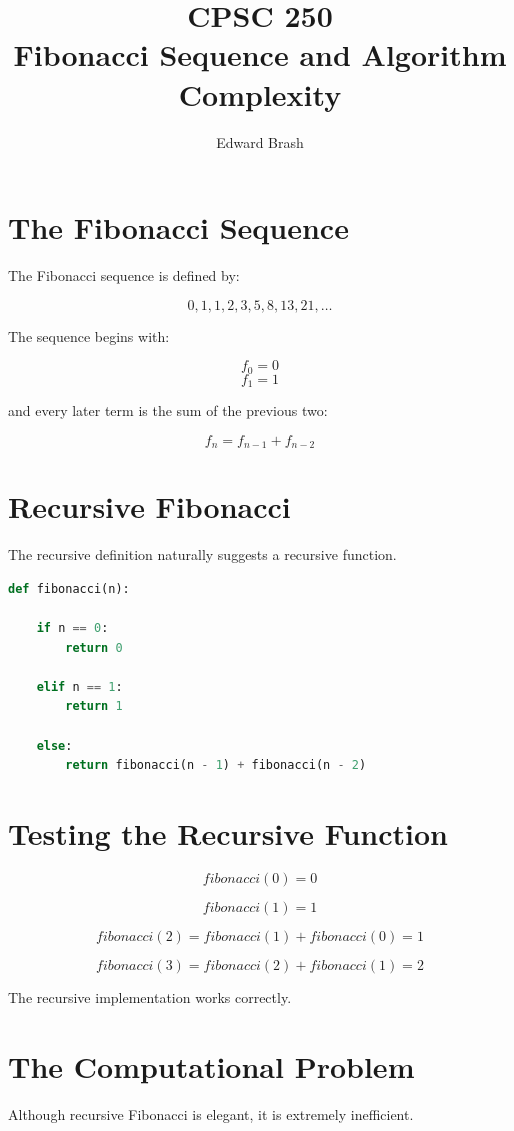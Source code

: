 \documentclass[11pt]{article}
\title{CPSC 250 \\ Fibonacci Sequence and Algorithm Complexity}
\author{Edward Brash}
\date{}
\begin{document}
\maketitle

\section{The Fibonacci Sequence}

The Fibonacci sequence is defined by:

\[
0, 1, 1, 2, 3, 5, 8, 13, 21, \dots
\]

The sequence begins with:

\[
f_0 = 0
\]
\[
f_1 = 1
\]

and every later term is the sum of the previous two:

\[
f_n = f_{n-1} + f_{n-2}
\]

\section{Recursive Fibonacci}

The recursive definition naturally suggests a recursive function.

\begin{lstlisting}[language=Python]
def fibonacci(n):

    if n == 0:
        return 0

    elif n == 1:
        return 1

    else:
        return fibonacci(n - 1) + fibonacci(n - 2)
\end{lstlisting}

\section{Testing the Recursive Function}

\[
fibonacci(0) = 0
\]

\[
fibonacci(1) = 1
\]

\[
fibonacci(2) = fibonacci(1) + fibonacci(0) = 1
\]

\[
fibonacci(3) = fibonacci(2) + fibonacci(1) = 2
\]

The recursive implementation works correctly.

\section{The Computational Problem}

Although recursive Fibonacci is elegant, it is extremely inefficient.
\end{document}
